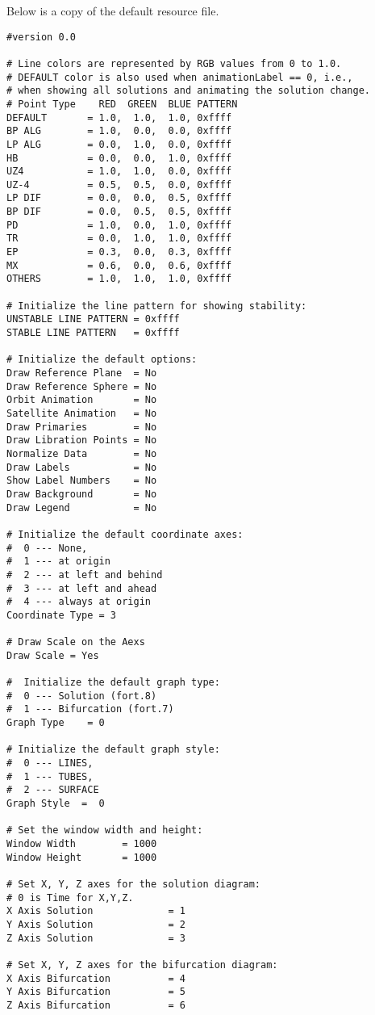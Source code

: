 Below is a copy of the default resource file. 
{\footnotesize
\begin{verbatim}
#version 0.0

# Line colors are represented by RGB values from 0 to 1.0.
# DEFAULT color is also used when animationLabel == 0, i.e.,
# when showing all solutions and animating the solution change.
# Point Type    RED  GREEN  BLUE PATTERN
DEFAULT       = 1.0,  1.0,  1.0, 0xffff
BP ALG        = 1.0,  0.0,  0.0, 0xffff
LP ALG        = 0.0,  1.0,  0.0, 0xffff
HB            = 0.0,  0.0,  1.0, 0xffff
UZ4           = 1.0,  1.0,  0.0, 0xffff
UZ-4          = 0.5,  0.5,  0.0, 0xffff
LP DIF        = 0.0,  0.0,  0.5, 0xffff
BP DIF        = 0.0,  0.5,  0.5, 0xffff
PD            = 1.0,  0.0,  1.0, 0xffff
TR            = 0.0,  1.0,  1.0, 0xffff
EP            = 0.3,  0.0,  0.3, 0xffff
MX            = 0.6,  0.0,  0.6, 0xffff
OTHERS        = 1.0,  1.0,  1.0, 0xffff

# Initialize the line pattern for showing stability:
UNSTABLE LINE PATTERN = 0xffff 
STABLE LINE PATTERN   = 0xffff

# Initialize the default options:
Draw Reference Plane  = No
Draw Reference Sphere = No
Orbit Animation       = No
Satellite Animation   = No 
Draw Primaries        = No 
Draw Libration Points = No 
Normalize Data        = No
Draw Labels           = No
Show Label Numbers    = No
Draw Background       = No
Draw Legend           = No

# Initialize the default coordinate axes:
#  0 --- None,
#  1 --- at origin
#  2 --- at left and behind
#  3 --- at left and ahead
#  4 --- always at origin
Coordinate Type = 3

# Draw Scale on the Aexs
Draw Scale = Yes 

#  Initialize the default graph type:
#  0 --- Solution (fort.8)
#  1 --- Bifurcation (fort.7)
Graph Type    = 0

# Initialize the default graph style:
#  0 --- LINES,
#  1 --- TUBES,
#  2 --- SURFACE
Graph Style  =  0

# Set the window width and height:
Window Width        = 1000
Window Height       = 1000 

# Set X, Y, Z axes for the solution diagram:
# 0 is Time for X,Y,Z.
X Axis Solution             = 1
Y Axis Solution             = 2
Z Axis Solution             = 3

# Set X, Y, Z axes for the bifurcation diagram:
X Axis Bifurcation          = 4
Y Axis Bifurcation          = 5
Z Axis Bifurcation          = 6


\end{verbatim}}
